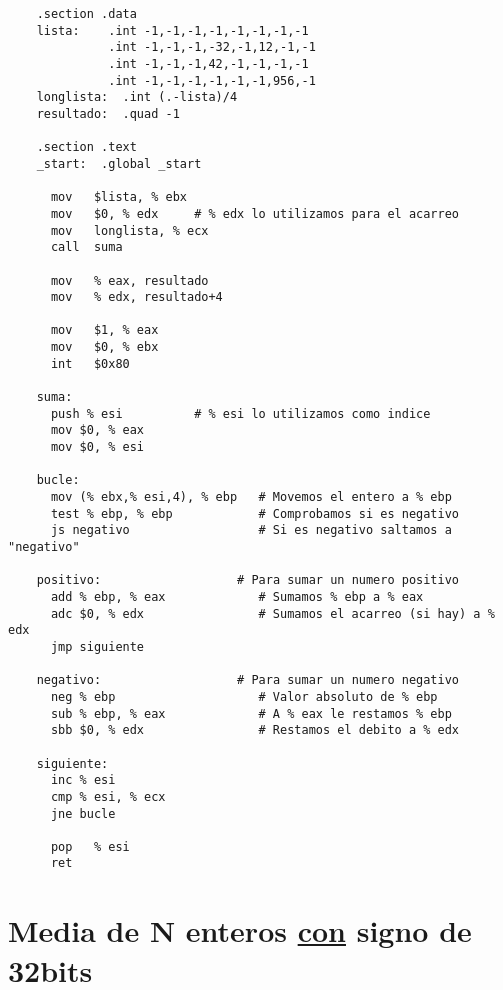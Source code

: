 \documentclass{article}
\begin{document}
  \begin{lstlisting}
    .section .data
    lista:    .int -1,-1,-1,-1,-1,-1,-1,-1
              .int -1,-1,-1,-32,-1,12,-1,-1
              .int -1,-1,-1,42,-1,-1,-1,-1
              .int -1,-1,-1,-1,-1,-1,956,-1
    longlista:	.int (.-lista)/4
    resultado:	.quad -1

    .section .text
    _start:  .global _start

      mov   $lista, % ebx
      mov   $0, % edx     # % edx lo utilizamos para el acarreo
      mov   longlista, % ecx
      call  suma

      mov   % eax, resultado
      mov   % edx, resultado+4

      mov   $1, % eax
      mov   $0, % ebx
      int   $0x80

    suma:
      push % esi          # % esi lo utilizamos como indice
      mov $0, % eax
      mov $0, % esi

    bucle:
      mov (% ebx,% esi,4), % ebp   # Movemos el entero a % ebp
      test % ebp, % ebp            # Comprobamos si es negativo
      js negativo                  # Si es negativo saltamos a "negativo"

    positivo:                   # Para sumar un numero positivo
      add % ebp, % eax             # Sumamos % ebp a % eax
      adc $0, % edx                # Sumamos el acarreo (si hay) a % edx
      jmp siguiente

    negativo:                   # Para sumar un numero negativo
      neg % ebp                    # Valor absoluto de % ebp
      sub % ebp, % eax             # A % eax le restamos % ebp
      sbb $0, % edx                # Restamos el debito a % edx

    siguiente:
      inc % esi
      cmp % esi, % ecx
      jne bucle

      pop   % esi
      ret
  \end{lstlisting}

\newpage
\section{Media de N enteros \underline{con} signo de 32bits}
\end{document}
